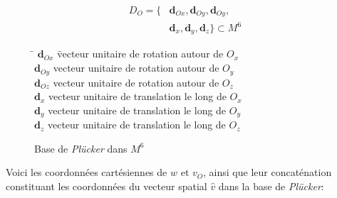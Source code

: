 \documentclass{report}
\begin{document}
\begin{figure}[H]
{%
}{%
  \begin{align*}
  D_{O} = \lbrace &\textbf{d}_{Ox}, \textbf{d}_{Oy}, \textbf{d}_{Oy}, \\
  &\textbf{d}_{x}, \textbf{d}_{y}, \textbf{d}_{z} \rbrace \subset M^{6}
  \end{align*}
}{%
  \begin{tabbing}
  \= $\textbf{d}_{Ox}$ \= vecteur unitaire de rotation autour de $O_{x}$\\
  \> $\textbf{d}_{Oy}$ \> vecteur unitaire de rotation autour de $O_{y}$\\
  \> $\textbf{d}_{Oz}$ \> vecteur unitaire de rotation autour de $O_{z}$\\
  \> $\textbf{d}_{x}$  \> vecteur unitaire de translation le long de $O_{x}$\\
  \> $\textbf{d}_{y}$  \> vecteur unitaire de translation le long de $O_{y}$\\
  \> $\textbf{d}_{z}$  \> vecteur unitaire de translation le long de $O_{z}$\\
  \end{tabbing}
}
\caption{Base de \emph{Plücker} dans $M^{6}$}
\label{fig_basePlucker}
\end{figure}

Voici les coordonnées cartésiennes de $w$ et $v_{O}$, ainsi que leur concaténation constituant les coordonnées du vecteur spatial $\widehat{v}$ dans la base de \emph{Plücker}:\\
\end{document}
